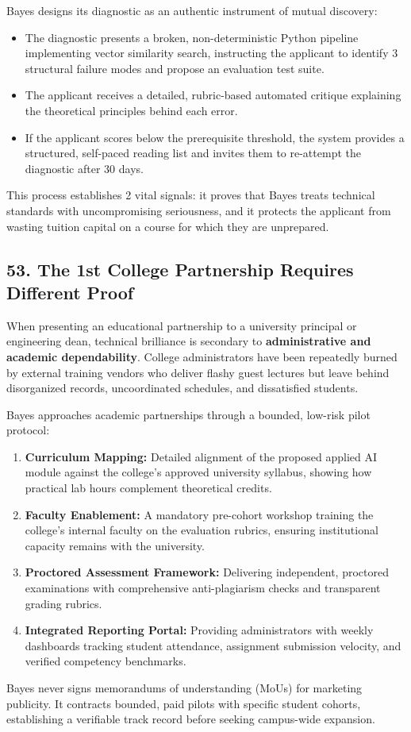 Bayes designs its diagnostic as an authentic instrument of mutual discovery:
\begin{itemize}
\item The diagnostic presents a broken, non-deterministic Python pipeline implementing vector similarity search, instructing the applicant to identify 3 structural failure modes and propose an evaluation test suite.
\item The applicant receives a detailed, rubric-based automated critique explaining the theoretical principles behind each error.
\item If the applicant scores below the prerequisite threshold, the system provides a structured, self-paced reading list and invites them to re-attempt the diagnostic after 30 days.
\end{itemize}

This process establishes 2 vital signals: it proves that Bayes treats technical standards with uncompromising seriousness, and it protects the applicant from wasting tuition capital on a course for which they are unprepared.

\subsection*{53. The 1st College Partnership Requires Different Proof}

When presenting an educational partnership to a university principal or engineering dean, technical brilliance is secondary to \textbf{administrative and academic dependability}. College administrators have been repeatedly burned by external training vendors who deliver flashy guest lectures but leave behind disorganized records, uncoordinated schedules, and dissatisfied students.

Bayes approaches academic partnerships through a bounded, low-risk pilot protocol:
\begin{enumerate}
\item \textbf{Curriculum Mapping:} Detailed alignment of the proposed applied AI module against the college's approved university syllabus, showing how practical lab hours complement theoretical credits.
\item \textbf{Faculty Enablement:} A mandatory pre-cohort workshop training the college's internal faculty on the evaluation rubrics, ensuring institutional capacity remains with the university.
\item \textbf{Proctored Assessment Framework:} Delivering independent, proctored examinations with comprehensive anti-plagiarism checks and transparent grading rubrics.
\item \textbf{Integrated Reporting Portal:} Providing administrators with weekly dashboards tracking student attendance, assignment submission velocity, and verified competency benchmarks.
\end{enumerate}

Bayes never signs memorandums of understanding (MoUs) for marketing publicity. It contracts bounded, paid pilots with specific student cohorts, establishing a verifiable track record before seeking campus-wide expansion.
